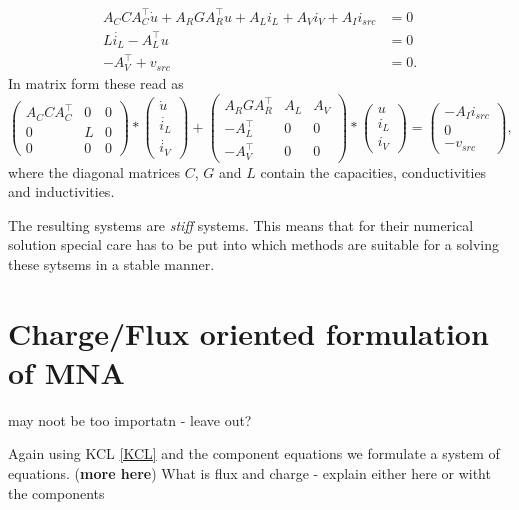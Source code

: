 \begin{displaymath}
	\begin{aligned}
		A_C C A_C^\top \dot{u} + A_R G A_R^\top u + A_L i_L + A_V i_V + A_I i_{src} &= 0 \\
		L \dot{i_L}	- A_L^\top u &= 0 \\
		-A_V^\top + v_{src} &= 0.
	\end{aligned}	
\end{displaymath}
In matrix form these read as
\begin{equation}
	\label{MNA_Matrixform}
	\begin{pmatrix}
		A_C C A_C^\top & 0 & 0 \\
		0 & L & 0 \\
		0 & 0 & 0
	\end{pmatrix}
	*
	\begin{pmatrix}
		\dot{u} \\
		\dot{i_L} \\
		\dot{i_V}
	\end{pmatrix}
	+
	\begin{pmatrix}
		A_R G A_R^\top & A_L & A_V \\
		-A_L^\top & 0 & 0 \\
		-A_V^\top & 0 & 0 
	\end{pmatrix}
	*
	\begin{pmatrix}
		u \\
		i_L \\
		i_V
	\end{pmatrix}
	=
	\begin{pmatrix}
		-A_I i_{src} \\
		0 \\
		-v_{src}
	\end{pmatrix} , 
\end{equation}
where the diagonal matrices $C$, $G$ and $L$ contain the capacities, conductivities and inductivities.

The resulting systems are \emph{stiff} systems. This means that for their numerical solution special care has to be put into which methods are suitable for a solving these sytsems in a stable manner.

\section{Charge/Flux oriented formulation of MNA}
may noot be too importatn - leave out?

Again using KCL \ref{KCL} and the component equations we formulate a system of equations. (\textbf{more here}) What is flux and charge - explain either here or witht the components

